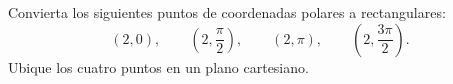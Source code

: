 Convierta los siguientes puntos de coordenadas polares a rectangulares:
\[
(2,0),\qquad \left(2,\frac{\pi}{2}\right),\qquad (2,\pi),\qquad \left(2,\frac{3\pi}{2}\right).
\]
Ubique los cuatro puntos en un plano cartesiano.
